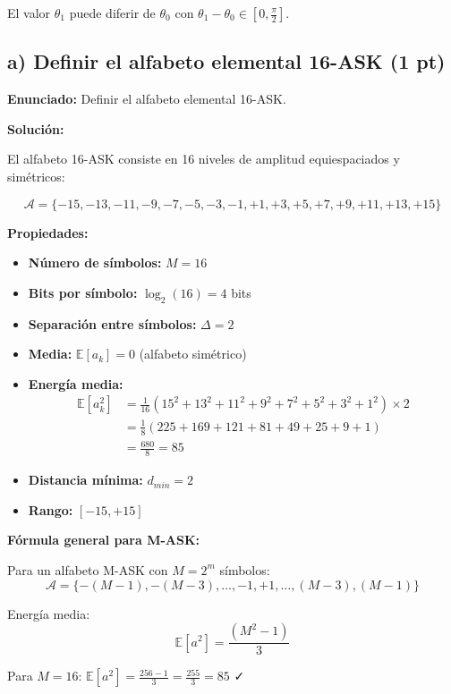 \documentclass[11pt,a4paper]{article}
\begin{document}
El valor $\theta_1$ puede diferir de $\theta_0$ con $\theta_1 - \theta_0 \in [0, \frac{\pi}{2}]$.

\subsection*{a) Definir el alfabeto elemental 16-ASK (1 pt)}

\textbf{Enunciado:} Definir el alfabeto elemental 16-ASK.

\vspace{0.3cm}
\textbf{Soluci\'on:}

El alfabeto 16-ASK consiste en 16 niveles de amplitud equiespaciados y sim\'etricos:

\[
\boxed{\mathcal{A} = \{-15, -13, -11, -9, -7, -5, -3, -1, +1, +3, +5, +7, +9, +11, +13, +15\}}
\]

\textbf{Propiedades:}
\begin{itemize}
    \item \textbf{N\'umero de s\'imbolos:} $M = 16$
    \item \textbf{Bits por s\'imbolo:} $\log_2(16) = 4$ bits
    \item \textbf{Separaci\'on entre s\'imbolos:} $\Delta = 2$
    \item \textbf{Media:} $\mathbb{E}[a_k] = 0$ (alfabeto sim\'etrico)
    \item \textbf{Energ\'ia media:}
    \begin{align*}
    \mathbb{E}[a_k^2] &= \frac{1}{16}(15^2 + 13^2 + 11^2 + 9^2 + 7^2 + 5^2 + 3^2 + 1^2) \times 2 \\
    &= \frac{1}{8}(225 + 169 + 121 + 81 + 49 + 25 + 9 + 1) \\
    &= \frac{680}{8} = 85
    \end{align*}
    \item \textbf{Distancia m\'inima:} $d_{min} = 2$
    \item \textbf{Rango:} $[-15, +15]$
\end{itemize}

\textbf{F\'ormula general para M-ASK:}

Para un alfabeto M-ASK con $M = 2^m$ s\'imbolos:
\[
\mathcal{A} = \{-(M-1), -(M-3), \ldots, -1, +1, \ldots, (M-3), (M-1)\}
\]

Energ\'ia media:
\[
\mathbb{E}[a^2] = \frac{(M^2 - 1)}{3}
\]

Para $M = 16$: $\mathbb{E}[a^2] = \frac{256 - 1}{3} = \frac{255}{3} = 85$ ✓
\end{document}
